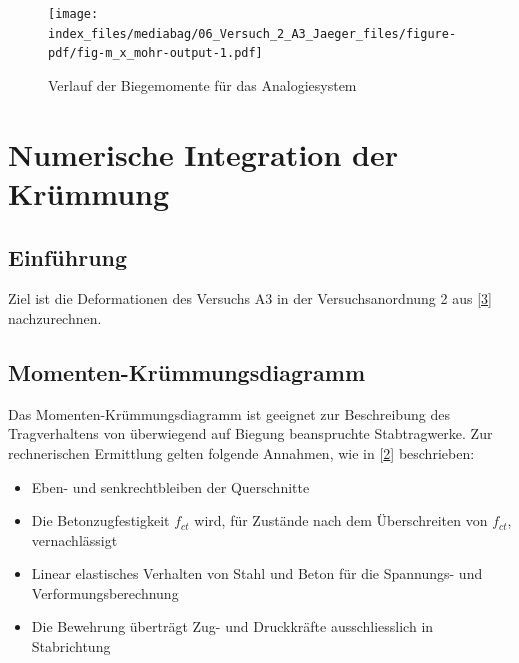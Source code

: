 \documentclass[
  12pt,
  letterpaper,
  egregdoesnotlikesansseriftitles]{scrreprt}
\providecommand{\tightlist}{%
  \setlength{\itemsep}{0pt}\setlength{\parskip}{0pt}}\usepackage{longtable,booktabs,array}
\begin{document}
\begin{figure}[H]

{\centering \texttt{[image: index\_files/mediabag/06\_Versuch\_2\_A3\_Jaeger\_files/figure-pdf/fig-m\_x\_mohr-output-1.pdf]}

}

\caption{\label{fig-m_x_mohr}Verlauf der Biegemomente für das
Analogiesystem}

\end{figure}

\hypertarget{numerische-integration-der-kruxfcmmung}{%
\section{Numerische Integration der
Krümmung}\label{numerische-integration-der-kruxfcmmung}}

\hypertarget{einfuxfchrung}{%
\subsection{Einführung}\label{einfuxfchrung}}

Ziel ist die Deformationen des Versuchs A3 in der Versuchsanordnung 2
aus {[}\protect\hyperlink{ref-Jaeger2006}{3}{]} nachzurechnen.

\hypertarget{momenten-kruxfcmmungsdiagramm}{%
\subsection{Momenten-Krümmungsdiagramm}\label{momenten-kruxfcmmungsdiagramm}}

Das Momenten-Krümmungsdiagramm ist geeignet zur Beschreibung des
Tragverhaltens von überwiegend auf Biegung beanspruchte Stabtragwerke.
Zur rechnerischen Ermittlung gelten folgende Annahmen, wie in
{[}\protect\hyperlink{ref-Spathelf2022}{2}{]} beschrieben:

\begin{itemize}
\tightlist
\item
  Eben- und senkrechtbleiben der Querschnitte
\item
  Die Betonzugfestigkeit \(f_{ct}\) wird, für Zustände nach dem
  Überschreiten von \(f_{ct}\), vernachlässigt
\item
  Linear elastisches Verhalten von Stahl und Beton für die Spannungs-
  und Verformungsberechnung
\item
  Die Bewehrung überträgt Zug- und Druckkräfte ausschliesslich in
  Stabrichtung
\end{itemize}
\end{document}
